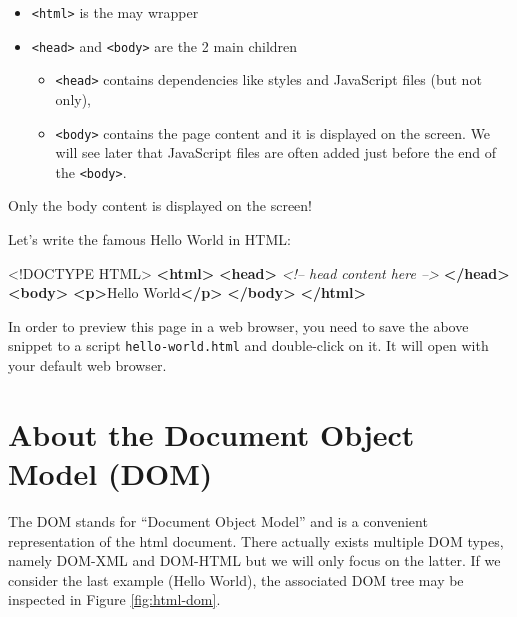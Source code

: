\documentclass[]{book}
\newenvironment{Shaded}{\begin{snugshade}}{\end{snugshade}}
\newcommand{\CommentTok}[1]{\textcolor[rgb]{0.56,0.35,0.01}{\textit{#1}}}
\newcommand{\DataTypeTok}[1]{\textcolor[rgb]{0.13,0.29,0.53}{#1}}
\newcommand{\KeywordTok}[1]{\textcolor[rgb]{0.13,0.29,0.53}{\textbf{#1}}}
\newcommand{\NormalTok}[1]{#1}
\providecommand{\tightlist}{%
  \setlength{\itemsep}{0pt}\setlength{\parskip}{0pt}}
\begin{document}
\begin{itemize}
\tightlist
\item
  \texttt{\textless{}html\textgreater{}} is the may wrapper
\item
  \texttt{\textless{}head\textgreater{}} and \texttt{\textless{}body\textgreater{}} are the 2 main children

  \begin{itemize}
  \tightlist
  \item
    \texttt{\textless{}head\textgreater{}} contains dependencies like styles and JavaScript files (but not only),
  \item
    \texttt{\textless{}body\textgreater{}} contains the page content and it is displayed on the screen. We will see later that JavaScript files are often added just before the end of the \texttt{\textless{}body\textgreater{}}.
  \end{itemize}
\end{itemize}

Only the body content is displayed on the screen!

Let's write the famous Hello World in HTML:

\begin{Shaded}
\begin{Highlighting}[]
\DataTypeTok{<!DOCTYPE }\NormalTok{HTML}\DataTypeTok{>}
\KeywordTok{<html>}
  \KeywordTok{<head>}
  \CommentTok{<!-- head content here -->}
  \KeywordTok{</head>}
  \KeywordTok{<body>}
  \KeywordTok{<p>}\NormalTok{Hello World}\KeywordTok{</p>}
  \KeywordTok{</body>}
\KeywordTok{</html>}
\end{Highlighting}
\end{Shaded}

In order to preview this page in a web browser, you need to save the above snippet to a script \texttt{hello-world.html} and double-click on it. It will open with your default web browser.

\hypertarget{about-the-document-object-model-dom}{%
\section{About the Document Object Model (DOM)}\label{about-the-document-object-model-dom}}

The DOM stands for ``Document Object Model'' and is a convenient representation of the html document. There actually exists multiple DOM types, namely DOM-XML and DOM-HTML but we will only focus on the latter. If we consider the last example (Hello World), the associated DOM tree may be inspected in Figure \ref{fig:html-dom}.
\end{document}
